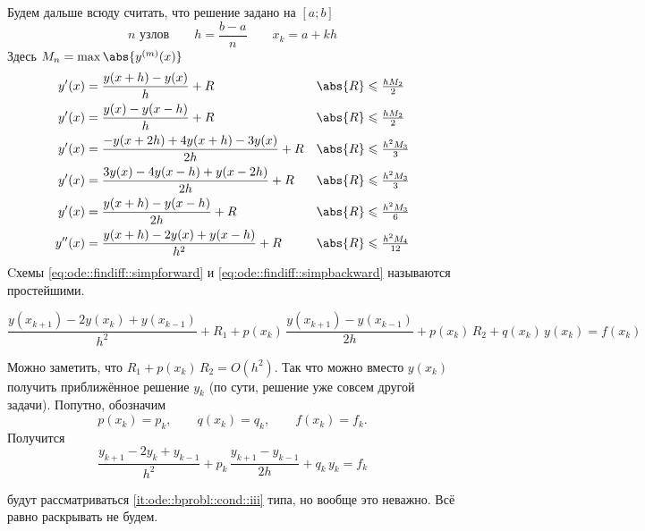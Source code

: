 \documentclass{trlnotes}
\begin{document}
Будем дальше всюду считать, что решение задано на $[a;b]$
\[
  \text{$n$ узлов}\qquad h = \frac{b-a}{n} \qquad x_k = a + kh
\]
Здесь $M_n = \max \abs{y^{(m)}(x)}$
\begin{align}
  \label{eq:ode::findiff::simpforward}
  y'(x) &= \frac{y(x+h) -y (x)}{h} + R & \abs{R} &\leqslant \tfrac{hM_2}{2} \\
  \label{eq:ode::findiff::simpbackward}
  y'(x) &= \frac{y(x) - y (x-h)}{h} + R & \abs{R} &\leqslant \tfrac{hM_2}{2} \\
  \label{eq:ode::findiff::threepointforward}
  y'(x) &= \frac{-y(x+2h) + 4y (x+h) - 3y(x)}{2h} + R & \abs{R} &\leqslant \tfrac{h^2M_3}{3} \\
  \label{eq:ode::findiff::threepointbackward}
  y'(x) &= \frac{3y(x) - 4y (x-h) + y(x-2h)}{2h} + R & \abs{R} &\leqslant \tfrac{h^2M_3}{3} \\
  \label{eq:ode::findiff::simmetric}
  y'(x) &= \frac{y(x+h) - y (x-h)}{2h} + R & \abs{R} &\leqslant \tfrac{h^2M_3}{6} \\
  \label{eq:ode::findiff::simmetricsecondorder}
  y''(x) &= \frac{y(x+h) - 2y (x) + y(x-h)}{h^2} + R & \abs{R} &\leqslant \tfrac{h^2M_4}{12}
\end{align}
Cхемы \ref{eq:ode::findiff::simpforward} и \ref{eq:ode::findiff::simpbackward} называются 
простейшими.


\begin{equation*}
  \frac{y(x_{k+1}) - 2y(x_k) + y(x_{k-1})}{h^2} + R_1 
  + p(x_k) \, \frac{y(x_{k+1}) - y(x_{k-1})}{2h} + p(x_k)\,R_2 
  + q(x_k) \, y(x_k) = f(x_k)
\end{equation*}

Можно заметить, что $R_1 + p(x_k)\, R_2 = O(h^2)$.
Так что можно вместо $y(x_k)$ получить приближённое решение $y_k$
(по сути, решение уже совсем другой задачи). Попутно, обозначим
\[
  p(x_k) = p_k,\qquad q(x_k) = q_k, \qquad f(x_k) = f_k.
\]
Получится
\begin{equation}\label{eq:ode::findiff::diffeq}
  \frac{y_{k+1} - 2y_k + y_{k-1}}{h^2}
  + p_k \, \frac{y_{k+1} - y_{k-1}}{2h} 
  + q_k \, y_k = f_k
\end{equation}

 будут рассматриваться \ref{it:ode::bprobl::cond::iii} типа,
но вообще это неважно. Всё равно раскрывать не будем.
\end{document}

